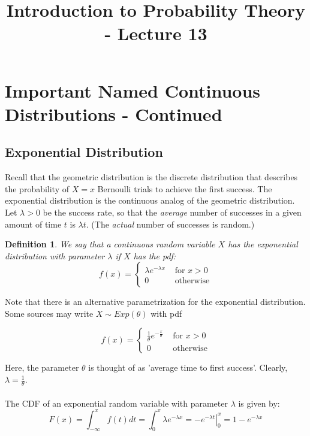 \documentclass[12pt]{article} %
\title{Introduction to Probability Theory - Lecture 13}
\newtheorem{defn}{Definition}
\begin{document}
\maketitle

\section{Important Named Continuous Distributions - Continued}
\subsection{Exponential Distribution}
Recall that the geometric distribution is the discrete distribution that describes the probability of $X=x$ Bernoulli trials to achieve the first success. The exponential distribution is the continuous analog of the geometric distribution. Let $\lambda >0$ be the success rate, so that the \emph{average} number of successes in a given amount of time $t$ is $\lambda t$. (The \emph{actual} number of successes is random.)
\begin{defn}
We say that a continuous random variable $X$ has the exponential distribution with parameter $\lambda$ if $X$ has the pdf:
$$f(x) =\left\{\begin{matrix}
\lambda e^{-\lambda x} &\textrm{ for } x>0\\
0&\textrm{ otherwise}
\end{matrix}\right.$$
\end{defn}
Note that there is an alternative parametrization for the exponential distribution. Some sources may write $X\sim Exp(\theta)$ with pdf

$$f(x) =\left\{\begin{matrix}
\frac{1}{\theta} e^{-\frac{x}{\theta}} &\textrm{ for } x>0\\
0&\textrm{ otherwise}
\end{matrix}\right.$$

Here, the parameter $\theta$ is thought of as 'average time to first success'. Clearly, $\lambda = \frac1\theta$.\\\\
The CDF of an exponential random variable with parameter $\lambda$ is given by:
$$F(x) = \int_{-\infty}^{x} f(t)dt =  \int_{0}^{x} \lambda e^{-\lambda x} = \left.-e^{-\lambda t}\right\rvert_0^x = 1-e^{-\lambda x}$$ 
\end{document}

